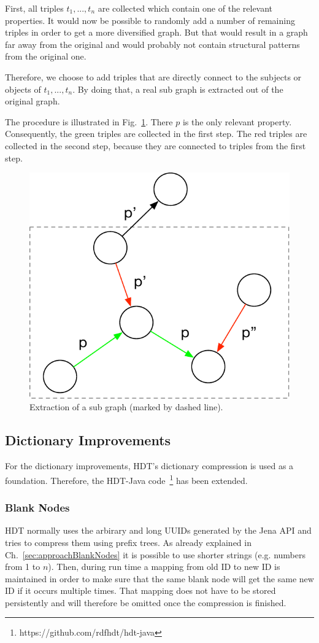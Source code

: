 First, all triples $t_1,...,t_n$ are collected which contain one of the relevant properties. It would now be possible to randomly add a number of remaining triples in order to get a more diversified graph. But that would result in a graph far away from the original and would probably not contain structural patterns from the original one.

Therefore, we choose to add triples that are directly connect to the subjects or objects of $t_1,...,t_n$. By doing that, a real sub graph is extracted out of the original graph.

The procedure is illustrated in Fig.~\ref{fig:subgraph}. There $p$ is the only relevant property. Consequently, the green triples are collected in the first step. The red triples are collected in the second step, because they are connected to triples from the first step.

\begin{figure}
	\centering
	\includegraphics[width=0.4\linewidth]{figures/4_implementation/subgraph}
	\caption{Extraction of a sub graph (marked by dashed line).}
	\label{fig:subgraph}
\end{figure}



\subsection{Dictionary Improvements}\label{sec:implementationDictImprovements}

For the dictionary improvements, HDT's dictionary compression is used as a foundation. Therefore, the HDT-Java code~\footnote{https://github.com/rdfhdt/hdt-java} has been extended.

\subsubsection{Blank Nodes}\label{sec:implementationBlankNodes}

HDT normally uses the arbirary and long UUIDs generated by the Jena API and tries to compress them using prefix trees. As already explained in Ch.~\ref{sec:approachBlankNodes} it is possible to use shorter strings (e.g. numbers from 1 to $n$). Then, during run time a mapping from old ID to new ID is maintained in order to make sure that the same blank node will get the same new ID if it occurs multiple times. That mapping does not have to be stored persistently and will therefore be omitted once the compression is finished.

